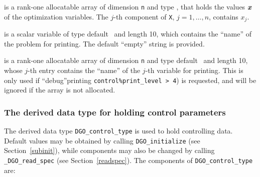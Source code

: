 \documentclass{galahad}
\newcommand{\packagename}{DGO}
\newcommand{\fullpackagename}{\libraryname\_\packagename}
\begin{document}
\begin{description}
 is a rank-one allocatable array of dimension {\tt n} and type
\realdp,
that holds the values ${\bm{x}}$ of the optimization variables.
The $j$-th component of {\tt X}, $j = 1,  \ldots , n$, contains $x_{j}$.

 is a scalar variable of type
default \character\ and length 10, which contains the
``name'' of the problem for printing. The default ``empty'' string is
provided.

 is a rank-one allocatable array of dimension {\tt n} and type
default \character\ and length 10, whose $j$-th entry contains the
``name'' of the $j$-th variable for printing. This is only used
if ``debug''printing {\tt control\%print\_level > 4}) is requested,
and will be ignored if the array is not allocated.

\end{description}


\subsubsection{The derived data type for holding control
 parameters}\label{typecontrol}
The derived data type
{\tt \packagename\_control\_type}
is used to hold controlling data. Default values may be obtained by calling
{\tt \packagename\_initialize}
(see Section~\ref{subinit}),
while components may also be changed by calling
{\tt \fullpackagename\_read\-\_spec}
(see Section~\ref{readspec}).
The components of
{\tt \packagename\_control\_type}
are:
\end{document}
